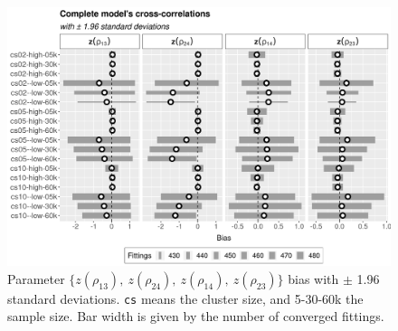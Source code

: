 \documentclass[a4paper,12pt]{article}
\begin{document}
\vspace{-0.573cm}
\begin{figure}[H]
 \centering
 \includegraphics[width=\linewidth]{pics/bias2plotsd-13.png}
 \vspace{-0.75cm}
 \caption{Parameter
   \(\{z(\rho_{13}),~z(\rho_{24}),~z(\rho_{14}),~z(\rho_{23})\}\) bias
   with \(\pm\) 1.96 standard deviations. \texttt{cs} means the cluster
   size, and 5-30-60k the sample size. Bar width is given by the number
   of converged fittings.}
 \label{fig:biassdrhoz4}
\end{figure}

 
\end{document}
